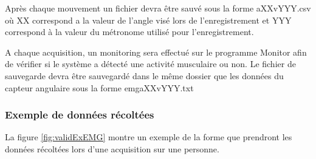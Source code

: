\documentclass[letterpaper, twoside, 12pt, memoire, creativecommons, hyperref]{thETS}
\begin{document}
Après chaque mouvement un fichier devra être sauvé sous la forme aXXvYYY.csv où XX correspond a la valeur de l’angle visé lors de l’enregistrement et YYY correspond à la valeur du métronome utilisé pour l’enregistrement.

A chaque acquisition, un monitoring sera effectué sur le programme Monitor afin de vérifier si le système a détecté une activité musculaire ou non. Le fichier de sauvegarde devra être sauvegardé dans le même dossier que les données du capteur angulaire sous la forme emgaXXvYYY.txt

\subsubsection{Exemple de données récoltées}

La figure \ref{fig:validExEMG} montre un exemple de la forme que prendront les données récoltées lors d’une acquisition sur une personne. %
\end{document}

